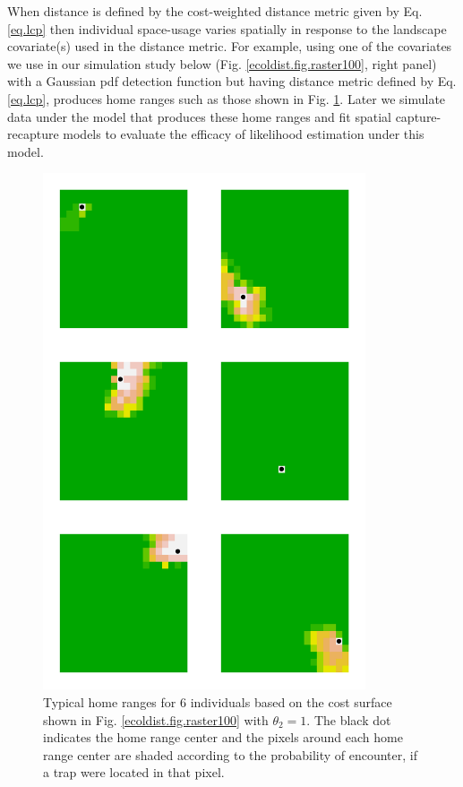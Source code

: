 When distance is defined by the cost-weighted distance metric given
by Eq. \ref{eq.lcp} then individual space-usage varies
spatially in response to the landscape covariate(s) used in the
distance metric. For example, using one of the covariates we use in
our simulation study below (Fig. \ref{ecoldist.fig.raster100}, right
panel) with a Gaussian pdf detection function but having distance
metric defined by Eq. \ref{eq.lcp}, produces home ranges such
as those shown in Fig. \ref{fig.homeranges}. Later we simulate data
under the model that produces these home ranges and fit spatial
capture-recapture models to evaluate the efficacy of likelihood
estimation under this model.

\begin{figure}
\begin{center}
\includegraphics[height=6in,width=3.75in]{Ch10/figs/home_ranges}
\end{center}
\caption{
Typical home ranges for 6 individuals based on the cost surface shown in
  Fig. \ref{ecoldist.fig.raster100} with $\theta_{2}=1$. The black dot indicates the home
  range center and the pixels around each home range center are shaded
according to the probability of encounter, if a trap were located in
that pixel.
}
\label{fig.homeranges}
\end{figure}


